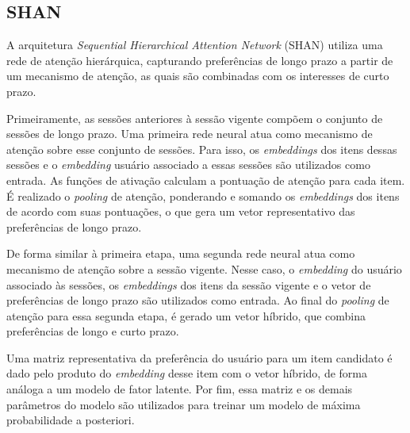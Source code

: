 \subsection{SHAN}
A arquitetura \textit{Sequential Hierarchical Attention Network} (SHAN) utiliza uma rede
de atenção hierárquica, capturando preferências de longo prazo a partir de um
mecanismo de atenção, as quais são combinadas com os interesses de curto
prazo\cite{shan}.

Primeiramente, as sessões anteriores à sessão vigente compõem o conjunto de
sessões de longo prazo. Uma primeira rede neural atua como mecanismo de atenção
sobre esse conjunto de sessões. Para isso, os \textit{embeddings} dos itens
dessas sessões e o \textit{embedding} usuário associado a essas sessões são
utilizados como entrada. As funções de ativação calculam a pontuação de atenção
para cada item. É realizado o \textit{pooling} de atenção, ponderando e somando
os \textit{embeddings} dos itens de acordo com suas pontuações, o que gera um
vetor representativo das preferências de longo prazo.

De forma similar à primeira etapa, uma segunda rede neural atua como mecanismo
de atenção sobre a sessão vigente. Nesse caso, o \textit{embedding} do usuário associado
às sessões, os \textit{embeddings} dos itens da sessão vigente e o vetor de
preferências de longo prazo são utilizados como entrada. Ao final do \textit{pooling}
de atenção para essa segunda etapa, é gerado um vetor híbrido, que combina
preferências de longo e curto prazo.

Uma matriz representativa da preferência do usuário para um item candidato é
dado pelo produto do \textit{embedding} desse item com o vetor híbrido, de forma
análoga a um modelo de fator latente. Por fim, essa matriz e os demais
parâmetros do modelo são utilizados para treinar um modelo de máxima
probabilidade a posteriori.





